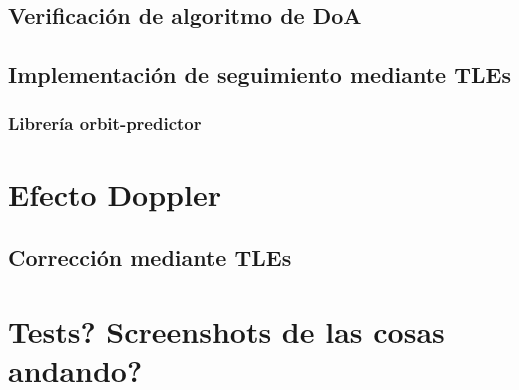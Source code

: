 \documentclass[../../main.tex]{subfiles}
\begin{document}
\subsection{Verificación de algoritmo de DoA}
\subsection{Implementación de seguimiento mediante TLEs}
\subsubsection{Librería orbit-predictor}

\section{Efecto Doppler}
\subsection{Corrección mediante TLEs}

\section{Tests? Screenshots de las cosas andando?}
\end{document}
